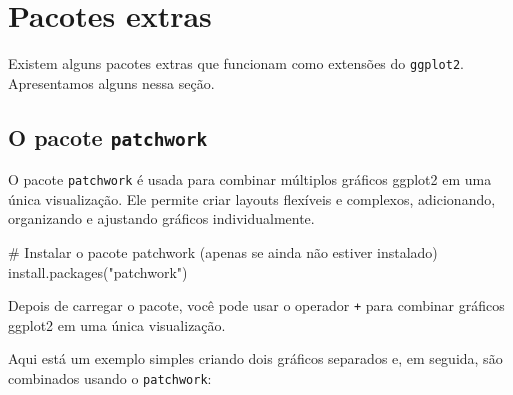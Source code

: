 \documentclass[
  portuguese,
  letterpaper,
  DIV=11,
  numbers=noendperiod]{scrreprt}
\newenvironment{Shaded}{\begin{snugshade}}{\end{snugshade}}
\newcommand{\CommentTok}[1]{\textcolor[rgb]{0.37,0.37,0.37}{#1}}
\newcommand{\FunctionTok}[1]{\textcolor[rgb]{0.28,0.35,0.67}{#1}}
\newcommand{\NormalTok}[1]{\textcolor[rgb]{0.00,0.23,0.31}{#1}}
\newcommand{\StringTok}[1]{\textcolor[rgb]{0.13,0.47,0.30}{#1}}
\theoremstyle{definition}
\theoremstyle{remark}
\begin{document}
\section{Pacotes extras}\label{pacotes-extras}

Existem alguns pacotes extras que funcionam como extensões do
\texttt{ggplot2}. Apresentamos alguns nessa seção.

\subsection{\texorpdfstring{O pacote
\texttt{patchwork}}{O pacote patchwork}}\label{o-pacote-patchwork}

O pacote \texttt{patchwork} é usada para combinar múltiplos gráficos
ggplot2 em uma única visualização. Ele permite criar layouts flexíveis e
complexos, adicionando, organizando e ajustando gráficos
individualmente.

\begin{Shaded}
\begin{Highlighting}[]
\CommentTok{\# Instalar o pacote patchwork (apenas se ainda não estiver instalado)}
\FunctionTok{install.packages}\NormalTok{(}\StringTok{"patchwork"}\NormalTok{)}
\end{Highlighting}
\end{Shaded}

Depois de carregar o pacote, você pode usar o operador \texttt{+} para
combinar gráficos ggplot2 em uma única visualização.

Aqui está um exemplo simples criando dois gráficos separados e, em
seguida, são combinados usando o \texttt{patchwork}:
\end{document}
